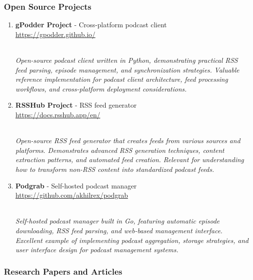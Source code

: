 \documentclass[
  letterpaper,
  DIV=11,
  numbers=noendperiod]{scrartcl}
\begin{document}
\subsubsection{Open Source Projects}\label{open-source-projects}

\begin{enumerate}
\def\labelenumi{\arabic{enumi}.}
\setcounter{enumi}{7}
\item
  \textbf{gPodder Project} - Cross-platform podcast client\\
  \url{https://gpodder.github.io/}\strut \\
  \emph{Open-source podcast client written in Python, demonstrating
  practical RSS feed parsing, episode management, and synchronization
  strategies. Valuable reference implementation for podcast client
  architecture, feed processing workflows, and cross-platform deployment
  considerations.}
\item
  \textbf{RSSHub Project} - RSS feed generator\\
  \url{https://docs.rsshub.app/en/}\strut \\
  \emph{Open-source RSS feed generator that creates feeds from various
  sources and platforms. Demonstrates advanced RSS generation
  techniques, content extraction patterns, and automated feed creation.
  Relevant for understanding how to transform non-RSS content into
  standardized podcast feeds.}
\item
  \textbf{Podgrab} - Self-hosted podcast manager\\
  \url{https://github.com/akhilrex/podgrab}\strut \\
  \emph{Self-hosted podcast manager built in Go, featuring automatic
  episode downloading, RSS feed parsing, and web-based management
  interface. Excellent example of implementing podcast aggregation,
  storage strategies, and user interface design for podcast management
  systems.}
\end{enumerate}

\subsubsection{Research Papers and
Articles}\label{research-papers-and-articles}
\end{document}
